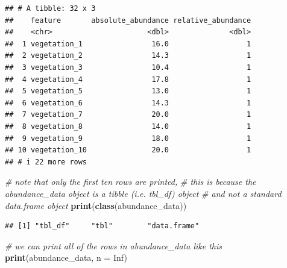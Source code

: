 \documentclass[12pt,]{book}
\newenvironment{Shaded}{\begin{snugshade}}{\end{snugshade}}
\newcommand{\CommentTok}[1]{\textcolor[rgb]{0.56,0.35,0.01}{\textit{#1}}}
\newcommand{\DataTypeTok}[1]{\textcolor[rgb]{0.13,0.29,0.53}{#1}}
\newcommand{\KeywordTok}[1]{\textcolor[rgb]{0.13,0.29,0.53}{\textbf{#1}}}
\newcommand{\NormalTok}[1]{#1}
\newcommand{\OtherTok}[1]{\textcolor[rgb]{0.56,0.35,0.01}{#1}}
\begin{document}
\begin{verbatim}
## # A tibble: 32 x 3
##    feature       absolute_abundance relative_abundance
##    <chr>                      <dbl>              <dbl>
##  1 vegetation_1                16.0                  1
##  2 vegetation_2                14.3                  1
##  3 vegetation_3                10.4                  1
##  4 vegetation_4                17.8                  1
##  5 vegetation_5                13.0                  1
##  6 vegetation_6                14.3                  1
##  7 vegetation_7                20.0                  1
##  8 vegetation_8                14.0                  1
##  9 vegetation_9                18.0                  1
## 10 vegetation_10               20.0                  1
## # i 22 more rows
\end{verbatim}

\clearpage

\begin{Shaded}
\begin{Highlighting}[]
\CommentTok{# note that only the first ten rows are printed,}
\CommentTok{# this is because the abundance_data object is a tibble (i.e. tbl_df) object}
\CommentTok{# and not a standard data.frame object}
\KeywordTok{print}\NormalTok{(}\KeywordTok{class}\NormalTok{(abundance_data))}
\end{Highlighting}
\end{Shaded}

\begin{verbatim}
## [1] "tbl_df"     "tbl"        "data.frame"
\end{verbatim}

\begin{Shaded}
\begin{Highlighting}[]
\CommentTok{# we can print all of the rows in abundance_data like this}
\KeywordTok{print}\NormalTok{(abundance_data, }\DataTypeTok{n =} \OtherTok{Inf}\NormalTok{)}
\end{Highlighting}
\end{Shaded}
\end{document}
